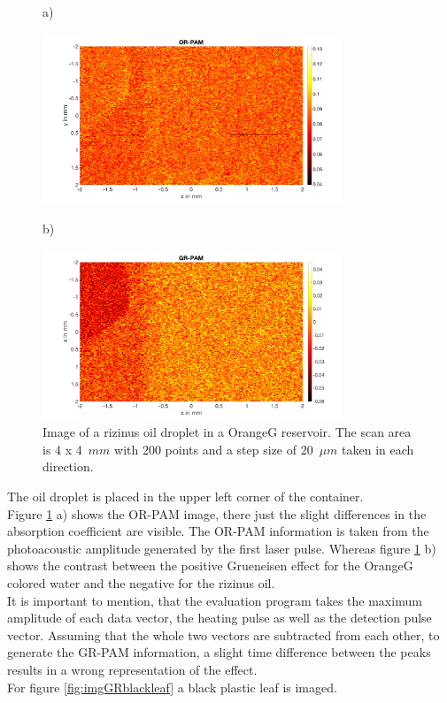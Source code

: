 \begin{figure}[H]
	a)
	\begin{minipage}{\textwidth}
		\centering	
		\includegraphics[width = 0.8\textwidth, height=0.38\textheight]{04_ex-results_of_PAM/images/oilDrop_OR.png}
	\end{minipage}	
	b)
	\begin{minipage}{\textwidth}
		\centering	
		\includegraphics[width = 0.8\textwidth, height=0.38\textheight]{04_ex-results_of_PAM/images/oilDrop_GR.png}
	\end{minipage}
	
	\caption{Image of a rizinus oil droplet in a OrangeG reservoir. The scan area is 4 x 4~$mm$ with 200 points and a step size of 20~$\mu m$ taken in each direction.}
	\label{fig:imgGRproof}
\end{figure}

The oil droplet is placed in the upper left corner of the container. \\
Figure \ref{fig:imgGRproof} a) shows the OR-PAM image, there just the slight differences in the absorption coefficient are visible. The OR-PAM information is taken from the photoacoustic amplitude generated by the first laser pulse. Whereas figure \ref{fig:imgGRproof} b) shows the contrast between the positive Grueneisen effect for the OrangeG colored water and the negative for the rizinus oil.\\
It is important to mention, that the evaluation program takes the maximum amplitude of each data vector, the heating pulse as well as the detection pulse vector. Assuming that the whole two vectors are subtracted from each other, to generate the GR-PAM information, a slight time difference between the peaks results in a wrong representation of the effect.\\
For figure \ref{fig:imgGRblackleaf} a black plastic leaf is imaged.\\


